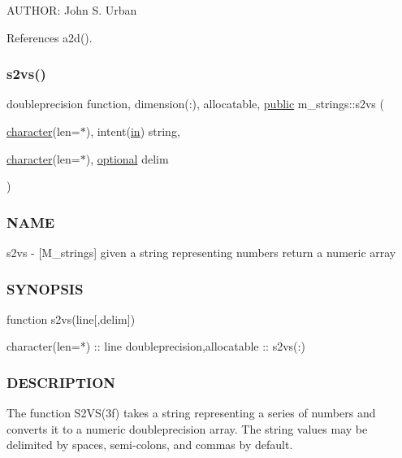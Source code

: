 A\+U\+T\+H\+OR\+: John S. Urban 

References a2d().

\mbox{\label{namespacem__strings_ad7fffe79559a666aa28e1ed598b8670f}} 
\subsubsection{\texorpdfstring{s2vs()}{s2vs()}}
{\footnotesize\ttfamily doubleprecision function, dimension(\+:), allocatable, \hyperlink{M__stopwatch_83_8txt_a2f74811300c361e53b430611a7d1769f}{public} m\+\_\+strings\+::s2vs (\begin{DoxyParamCaption}\item[{\hyperlink{option__stopwatch_83_8txt_abd4b21fbbd175834027b5224bfe97e66}{character}(len=$\ast$), intent(\hyperlink{M__journal_83_8txt_afce72651d1eed785a2132bee863b2f38}{in})}]{string,  }\item[{\hyperlink{option__stopwatch_83_8txt_abd4b21fbbd175834027b5224bfe97e66}{character}(len=$\ast$), \hyperlink{option__stopwatch_83_8txt_aa4ece75e7acf58a4843f70fe18c3ade5}{optional}}]{delim }\end{DoxyParamCaption})}



\subsubsection*{N\+A\+ME}

s2vs -\/ \mbox{[}M\+\_\+strings\mbox{]} given a string representing numbers return a numeric array 

\subsubsection*{S\+Y\+N\+O\+P\+S\+IS}

\begin{DoxyVerb}   function s2vs(line[,delim])

    character(len=*) :: line
    doubleprecision,allocatable :: s2vs(:)
\end{DoxyVerb}


\subsubsection*{D\+E\+S\+C\+R\+I\+P\+T\+I\+ON}

\begin{DoxyVerb}The function S2VS(3f) takes a string representing a series of numbers
and converts it to a numeric doubleprecision array. The string values
may be delimited by spaces, semi-colons, and commas by default.
\end{DoxyVerb}


